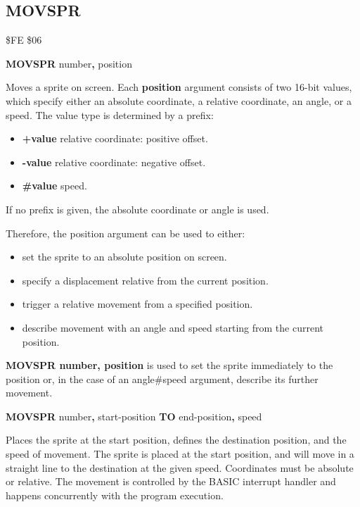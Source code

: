\subsection{MOVSPR}
\begin{description}[leftmargin=2cm,style=nextline]
\item [Token:] \$FE \$06
\item [Format:] {\bf MOVSPR} number{\bf,} position
\item [Usage:]  Moves a sprite on screen. Each {\bf position} argument consists of two 16-bit values,
                which specify either an absolute coordinate, a relative coordinate,
                an angle, or a speed. The value type is determined by a prefix:

                \begin{itemize}
                    \item {\bf +value} relative coordinate: positive offset.
                    \item {\bf -value} relative coordinate: negative offset.
                    \item {\bf \#value} speed.
                \end{itemize}

                If no prefix is given, the absolute coordinate or angle is used.

                  Therefore, the position argument can be used to either:
                \begin{itemize}
                    \item set the sprite to an absolute position on screen.
                    \item specify a displacement relative from the current position.
                    \item trigger a relative movement from a specified position.
                    \item describe movement with an angle and speed starting from the current position.
                \end{itemize}

                {\bf MOVSPR number, position} is used to
                set the sprite immediately to the position or, in the case of
                an angle\#speed argument, describe its further movement.

\item [Format:] {\bf MOVSPR} number{\bf,} start-position
		{\bf TO} end-position{\bf,} speed
\item [Usage:]  Places the sprite at the start position, defines the
                destination position, and the speed of movement.
                The sprite is placed at the start position, and will move
                in a straight line to the destination at the given speed.
                Coordinates must be absolute or relative.
                The movement is controlled by the BASIC interrupt handler and
                happens concurrently with the program execution.


\end{description}
